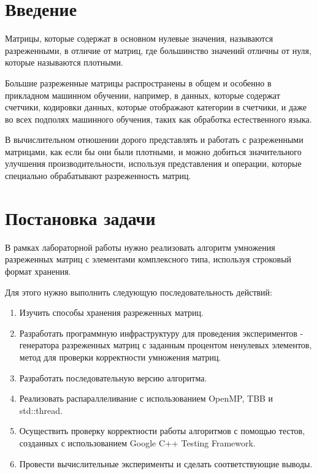 \documentclass{report}
\begin{document}
\setcounter{page}{2}

\tableofcontents
\newpage

\section*{Введение}
Матрицы, которые содержат в основном нулевые значения, называются разреженными, в отличие от матриц, где большинство значений отличны от нуля, которые называются плотными.

Большие разреженные матрицы распространены в общем и особенно в прикладном машинном обучении, например, в данных, которые содержат счетчики, кодировки данных, которые отображают категории в счетчики, и даже во всех подполях машинного обучения, таких как обработка естественного языка.

В вычислительном отношении дорого представлять и работать с разреженными матрицами, как если бы они были плотными, и можно добиться значительного улучшения производительности, используя представления и операции, которые специально обрабатывают разреженность матриц.

\newpage

\section*{Постановка задачи}
В рамках лабораторной работы нужно реализовать алгоритм умножения разреженных матриц с элементами комплексного типа, используя строковый формат хранения.

\par Для этого нужно выполнить следующую последовательность действий:

\begin{enumerate}
\item Изучить способы хранения разреженных матриц.
\item Разработать программную инфраструктуру для проведения экспериментов - генератора разреженных матриц с заданным процентом ненулевых элементов, метод для проверки корректности умножения матриц.
\item Разработать последовательную версию алгоритма.
\item Реализовать распараллеливание с использованием OpenMP, TBB и std::thread.
\item Осуществить проверку корректности работы алгоритмов с помощью тестов, созданных с использованием Google C++ Testing Framework.
\item Провести вычислительные эксперименты и сделать соответствующие выводы.
\end{enumerate}
\newpage
\end{document}
